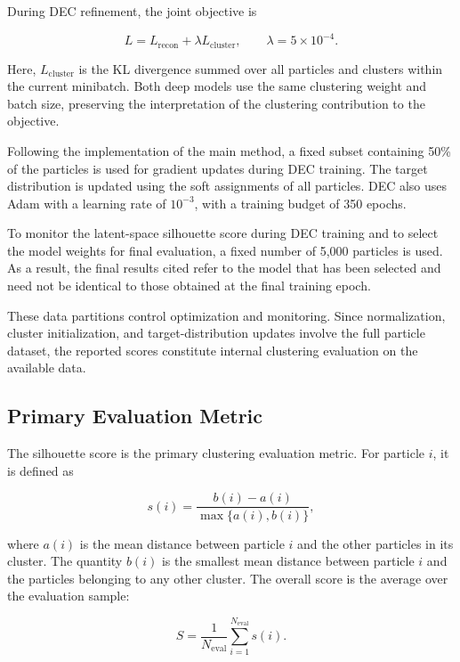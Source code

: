 During DEC refinement, the joint objective is

\begin{equation} L=L_{\mathrm{recon}}+\lambda L_{\mathrm{cluster}}, \qquad \lambda=5\times10^{-4}. \end{equation}

Here, \(L_{\mathrm{cluster}}\) is the KL divergence summed over all particles and clusters within the current minibatch. Both deep models use the same clustering weight and batch size, preserving the interpretation of the clustering contribution to the objective.

Following the implementation of the main method, a fixed subset containing 50\% of the particles is used for gradient updates during DEC training. The target distribution is updated using the soft assignments of all particles. DEC also uses Adam with a learning rate of \(10^{-3}\), with a training budget of 350 epochs.

To monitor the latent-space silhouette score during DEC training and to select the model weights for final evaluation, a fixed number of 5,000 particles is used. As a result, the final results cited refer to the model that has been selected and need not be identical to those obtained at the final training epoch.

These data partitions control optimization and monitoring. Since normalization, cluster initialization, and target-distribution updates involve the full particle dataset, the reported scores constitute internal clustering evaluation on the available data.

\subsection{Primary Evaluation Metric}

The silhouette score is the primary clustering evaluation metric. For particle \(i\), it is defined as

\begin{equation} s(i)=\frac{b(i)-a(i)} {\max\{a(i),b(i)\}}, \end{equation}

where \(a(i)\) is the mean distance between particle \(i\) and the other particles in its cluster. The quantity \(b(i)\) is the smallest mean distance between particle \(i\) and the particles belonging to any other cluster. The overall score is the average over the evaluation sample:

\begin{equation} S=\frac{1}{N_{\mathrm{eval}}} \sum_{i=1}^{N_{\mathrm{eval}}}s(i). \end{equation}

